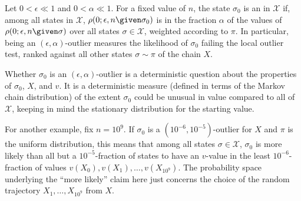 \documentclass[12pt]{article}
\begin{document}
\begin{definition}
    Let \( 0 < \epsilon \ll 1 \) and \( 0 < \alpha \ll 1 \). For a fixed
    value of \( n \), the state \( \sigma_0 \) is an  in \( \mathcal{X} \) if, among all states in \(
    \mathcal{X} \), \( \rho(0; \epsilon, n \given \sigma_{0}) \) is in
    the fraction \( \alpha \) of the values of \( \rho(0; \epsilon, n
    \given \sigma) \) over all states \( \sigma \in \mathcal{X} \),
    weighted according to \( \pi \).  In particular, being an \( (\epsilon,
    \alpha) \)-outlier measures the likelihood of \( \sigma_0 \) failing
    the local outlier test, ranked against all other states \( \sigma
    \sim \pi \) of the chain \( X \).
\end{definition}

Whether \( \sigma_0 \) is an \( (\epsilon, \alpha) \)-outlier is a
deterministic question about the properties of \( \sigma_0 \), \( X \),
and \( v \).  It is a deterministic measure (defined in terms of the
Markov chain distribution) of the extent \( \sigma_0 \) could be unusual
in value compared to all of \( \mathcal{X} \), keeping in mind the
stationary distribution for the starting value.

\begin{example}
    For another example, fix \( n = 10^9 \).  If \( \sigma_0 \) is a \(
    (10^{-6}, 10^{-5}) \)-outlier for \( X \) and \( \pi \) is the
    uniform distribution, this means that among all states \( \sigma \in
    \mathcal{X} \), \( \sigma_0 \) is more likely than all but a \( 10^{-5}
    \)-fraction of states to have an \( v \)-value in the least \( 10^{-6}
    \)-fraction of values \( v(X_0), v(X_1 ), \dots , v(X_{10^9} ) \).
    The probability space underlying the ``more likely'' claim here just
    concerns the choice of the random trajectory \( X_1, \dots, X_{10^9}
    \) from \( X \).
\end{example}
\end{document}
